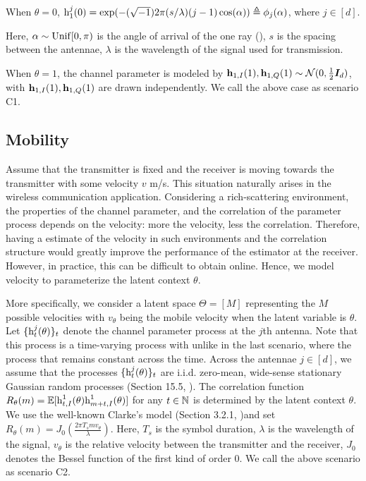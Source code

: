 \documentclass[journal,letterpaper,onecolumn]{IEEEtran}
\begin{document}
    When $\theta=0$, ${\textnormal{h}}_1^j(0) = \exp(-(\sqrt{-1})2\pi (s/\lambda)(j-1)\cos(\alpha)) \triangleq \phi_j(\alpha)$, where $j\in[d]$. 
    
    Here, $\alpha \sim {\rm Unif}[0, \pi)$ is the angle of arrival of the one ray (\cite{goldsmith_2005}), $s$ is the spacing between the antennae, $\lambda$ is the wavelength of the signal used for transmission.

    When $\theta=1$, the channel parameter is modeled by ${\mathbf{h}}_{1, I}(1),{\mathbf{h}}_{1, Q}(1) \sim \mathcal{N}(0, \frac{1}{2}{\bm{I}}_d)$, with ${\mathbf{h}}_{1, I}(1), {\mathbf{h}}_{1, Q}(1)$ are drawn independently. We call the above case as scenario C1.

\subsection{Mobility}

Assume that the transmitter is fixed and the receiver is moving towards the transmitter with some velocity $v$ m/s. This situation naturally arises in the wireless communication application. Considering a rich-scattering environment, the properties of the channel parameter, and the correlation of the parameter process depends on the velocity: more the velocity, less the correlation. Therefore, having a estimate of the velocity in such environments and the correlation structure would greatly improve the performance of the estimator at the receiver. However, in practice, this can be difficult to obtain online. Hence, we model velocity to parameterize the latent context $\theta$. 

More specifically, we consider a latent space $\Theta = [M]$  representing the $M$ possible velocities with $v_\theta$ being the mobile velocity when the latent variable is $\theta$. Let $\{{\textnormal{h}}^j_t(\theta)\}_t$ denote the channel parameter process at the $j$th antenna. Note that this process is a time-varying process with unlike in the last scenario, where the process that remains constant across the time. Across the antennae $j\in[d]$, we assume that the processes $\{{\textnormal{h}}^j_t(\theta)\}_t$ are  i.i.d. zero-mean, wide-sense stationary Gaussian random processes (Section 15.5, \cite{Kay97}). The correlation function $R_\theta(m) = \mathbb{E}[{\textnormal{h}}_{t, I}^1(\theta) {\textnormal{h}}^1_{m+t, I}(\theta)]$ for any $t\in{\mathbb{N}}$ is determined by the latent context $\theta$. We use the well-known Clarke's model (Section 3.2.1, \cite{goldsmith_2005})and set $R_\theta(m) = J_0(\frac{2\pi T_s m v_\theta}{\lambda})$. Here, $T_s$ is the symbol duration, $\lambda$ is the wavelength of the signal, $v_\theta$ is the relative velocity between the transmitter and the receiver, $J_0$ denotes the Bessel function of the first kind of order $0$. 
We call the above scenario as scenario C2.
\end{document}
